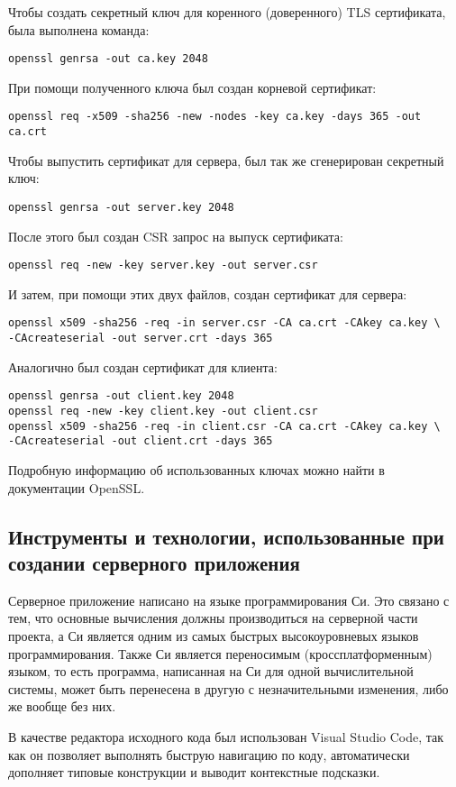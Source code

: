 Чтобы создать секретный ключ для коренного (доверенного) TLS сертификата, была выполнена команда:
\begin{verbatim}
openssl genrsa -out ca.key 2048
\end{verbatim}
При помощи полученного ключа был создан корневой сертификат:
\begin{verbatim}
openssl req -x509 -sha256 -new -nodes -key ca.key -days 365 -out ca.crt
\end{verbatim}
Чтобы выпустить сертификат для сервера, был так же сгенерирован секретный ключ:
\begin{verbatim}
openssl genrsa -out server.key 2048
\end{verbatim}
После этого был создан CSR запрос на выпуск сертификата:
\begin{verbatim}
openssl req -new -key server.key -out server.csr
\end{verbatim}
И затем, при помощи этих двух файлов, создан сертификат для сервера:
\begin{verbatim}
openssl x509 -sha256 -req -in server.csr -CA ca.crt -CAkey ca.key \
-CAcreateserial -out server.crt -days 365
\end{verbatim}
Аналогично был создан сертификат для клиента:
\begin{verbatim}
openssl genrsa -out client.key 2048
openssl req -new -key client.key -out client.csr
openssl x509 -sha256 -req -in client.csr -CA ca.crt -CAkey ca.key \
-CAcreateserial -out client.crt -days 365
\end{verbatim}
Подробную информацию об использованных ключах можно найти в документации  OpenSSL\cite{Openssl}.

\subsection{Инструменты и технологии, использованные при создании серверного приложения}

Серверное приложение написано на языке программирования Си.
Это связано с тем, что основные вычисления должны производиться на серверной части проекта, а Си является одним из самых быстрых высокоуровневых языков программирования. Также Си является переносимым (кроссплатформенным) языком, то есть программа, написанная на Си для одной вычислительной системы, может быть перенесена в другую с незначительными изменения, либо же вообще без них.

В качестве редактора исходного кода был использован Visual Studio Code, так как он позволяет выполнять быструю навигацию по коду, автоматически дополняет типовые конструкции и выводит контекстные подсказки.


